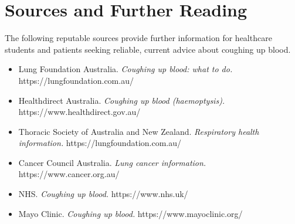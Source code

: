 \section*{Sources and Further Reading}
The following reputable sources provide further information for healthcare students and patients seeking reliable, current advice about coughing up blood.

\begin{itemize}
    \item Lung Foundation Australia. \textit{Coughing up blood: what to do.} https://lungfoundation.com.au/
    \item Healthdirect Australia. \textit{Coughing up blood (haemoptysis).} https://www.healthdirect.gov.au/
    \item Thoracic Society of Australia and New Zealand. \textit{Respiratory health information.} https://lungfoundation.com.au/
    \item Cancer Council Australia. \textit{Lung cancer information.} https://www.cancer.org.au/
    \item NHS. \textit{Coughing up blood.} https://www.nhs.uk/
    \item Mayo Clinic. \textit{Coughing up blood.} https://www.mayoclinic.org/
\end{itemize}
